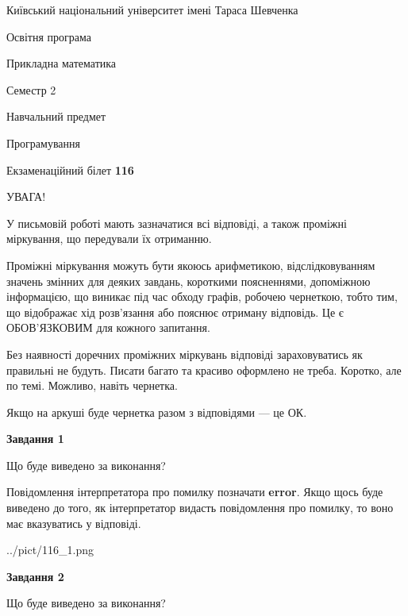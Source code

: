 \documentclass[12pt, ukrainian]{article}
\begin{document}
{{\begin {small}\par
{ \center  Київський національний університет імені Тараса Шевченка \par}
{\parbox {5 cm}{Освітня програма \hfill}{\parbox {7 cm}{Прикладна математика \hfill}}\parbox {6 cm}{\hfill Семестр 2}}\par
{\parbox {5 cm} {Навчальний предмет \hfill}\parbox {7 cm}{Програмування \hfill}\parbox {6cm}{\hfill}\par}\vspace{-7pt} \end{small}}{\center Екзаменаційний білет \No \textbf
{ 116 }\par}}
{
\begin {large}
УВАГА!

У письмовій роботі мають зазначатися всі відповіді, а також проміжні міркування, що передували їх отриманню.

Проміжні міркування можуть бути якоюсь арифметикою, відслідковуванням зна\-чень змінних для деяких завдань,
короткими поясненнями, допоміжною інформацією, що виникає під час обходу графів, робочею чернеткою,
тобто тим, що відображає хід розв’язання або пояснює отриману відповідь.
Це є ОБОВ’ЯЗКОВИМ для кожного запитання.

Без наявності доречних проміжних міркувань відповіді зараховуватись як правиль\-ні не будуть.
Писати багато та красиво оформлено не треба. Коротко, але по темі. Можли\-во, навіть чернетка.

Якщо на аркуші буде чернетка разом з відповідями --- це ОК.

\newpage

{\begin {center}\textbf{Завдання 1}\end {center}}\par
Що буде виведено за виконання?

Повідомлення інтерпретатора про помилку позначати \textbf{error}.
Якщо щось буде виведено до того, як інтерпретатор видасть повідомлення про помилку, 
то воно має вказуватись у відповіді. \par


\begin{center}
	{../pict/116_1.png}
\end{center}
\newpage

{\begin {center}\textbf{Завдання 2}\end {center}}\par
Що буде виведено за виконання?


\end{large}}
\end{document}
